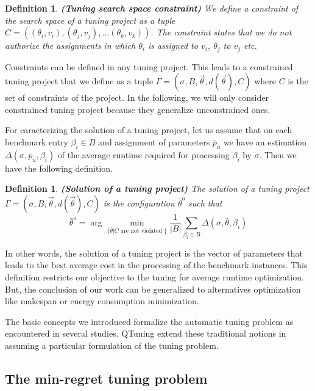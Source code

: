 \documentclass[10pt, conference, compsocconf]{IEEEtran}
\newtheorem{definition}[theorem]{Definition}
\begin{document}
\begin{definition}{\bf (Tuning search space constraint)}
We define a constraint of the search space of a tuning project as a tuple $C = ((\theta_i, v_i), (\theta_j, v_j),\dots (\theta_k, v_k))$.
The constraint states that we do not authorize the assignments in which $\theta_i$ is assigned to $v_i$, $\theta_j$ to $v_j$ etc.
\end{definition}


Constraints can be defined in any tuning project. This leads to a constrained tuning project that we define
 as a tuple $ \Gamma = (\sigma, B, \vec{\theta}, d(\vec{\theta}), C)$ where $C$ is the set of constraints of the project.
In the following, we will only consider constrained tuning project because they generalize unconstrained ones.


For caracterizing the solution of a tuning project, let us assume that on each benchmark entry $\beta_i \in B$
and assignment of parameters $\bar{p}_u$ we have an estimation $\Delta(\sigma, \bar{p}_u, \beta_i)$ of the
average runtime required for processing $\beta_i$ by $\sigma$. Then we have the following definition.

\begin{definition}{\bf (Solution of a tuning project)}
The solution of a tuning project $ \Gamma = (\sigma, B, \vec{\theta}, d(\vec{\theta}), C)$  is the configuration
$\bar{\theta}^o$ such that \[ \bar{\theta}^o = \arg \underset{\{\bar{\theta} | C \text{ are not violated }\}}{\min} \frac{1}{|B|}\sum_{\beta_i \in B} \Delta(\sigma, \bar{\theta}, \beta_i) \]
\end{definition}

In other words, the solution of a tuning project is the vector of parameters that leads to the best average
cost in the processing of the benchmark instances. This definition restricts our objective to the tuning for average runtime
optimization. But, the conclusion of our work can be generalized to alternatives optimization like makespan or energy
consumption minimization.

The basic concepts we introduced formalize the automatic tuning problem as encountered in several studies.
QTuning extend these traditional notions in assuming a particular formulation of the tuning problem.

\subsection{The min-regret tuning problem}
\end{document}

